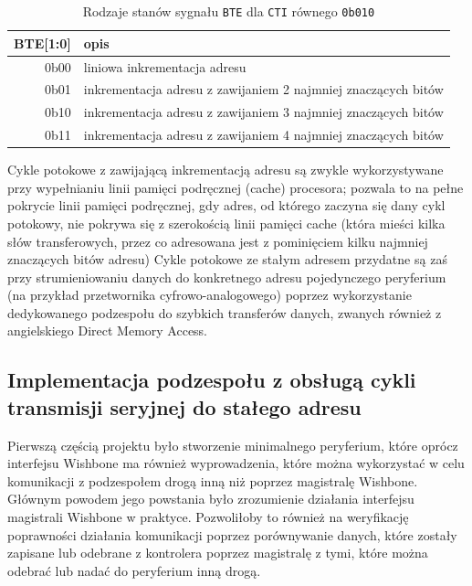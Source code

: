 \begin{table}[H]
\begin{center}
\begin{tabular}{ r|l }
 BTE[1:0] & opis \\ 
 \hline
 0b00 & liniowa inkrementacja adresu \\
 0b01 & inkrementacja adresu z zawijaniem 2 najmniej znaczących bitów \\
 0b10 & inkrementacja adresu z zawijaniem 3 najmniej znaczących bitów \\
 0b11 & inkrementacja adresu z zawijaniem 4 najmniej znaczących bitów \\
 \hline
\end{tabular}
\end{center}
\caption{\label{tab:signal-states-bte}Rodzaje stanów sygnału \texttt{BTE} dla \texttt{CTI} równego \texttt{0b010}}
\end{table}

Cykle potokowe z zawijającą inkrementacją adresu są zwykle wykorzystywane przy wypełnianiu linii pamięci podręcznej (cache) procesora; pozwala to na pełne pokrycie linii pamięci podręcznej, gdy adres, od którego zaczyna się dany cykl potokowy, nie pokrywa się z szerokością linii pamięci cache (która mieści kilka słów transferowych, przez co adresowana jest z pominięciem kilku najmniej znaczących bitów adresu)
Cykle potokowe ze stałym adresem przydatne są zaś przy strumieniowaniu danych do konkretnego adresu pojedynczego peryferium (na przykład przetwornika cyfrowo-analogowego) poprzez wykorzystanie dedykowanego podzespołu do szybkich transferów danych, zwanych również z angielskiego Direct Memory Access.

\subsection{Implementacja podzespołu z obsługą cykli transmisji seryjnej do stałego adresu}

Pierwszą częścią projektu było stworzenie minimalnego peryferium, które oprócz interfejsu Wishbone ma również wyprowadzenia, które można wykorzystać w celu komunikacji z podzespołem drogą inną niż poprzez magistralę Wishbone. Głównym powodem jego powstania było zrozumienie działania interfejsu magistrali Wishbone w praktyce. Pozwoliłoby to również na weryfikację poprawności działania komunikacji poprzez porównywanie danych, które zostały zapisane lub odebrane z kontrolera poprzez magistralę z tymi, które można odebrać lub nadać do peryferium inną drogą.

